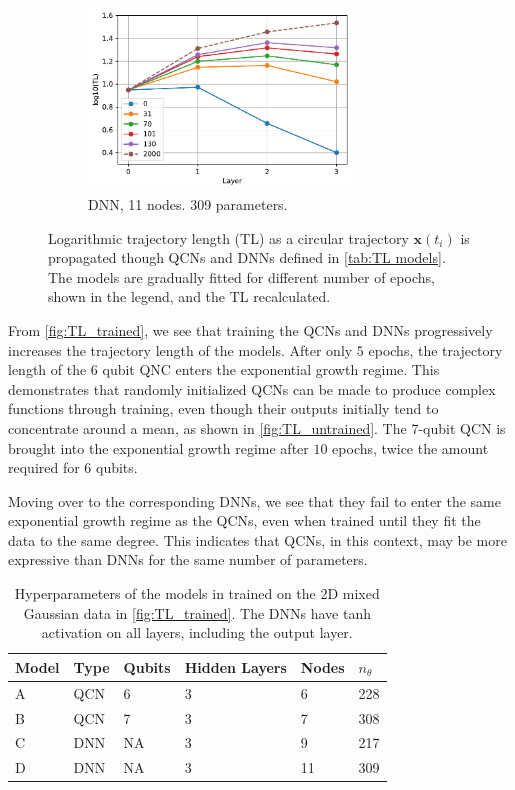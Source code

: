 \begin{figure}[H]
\begin{subfigure}[t]{0.5\textwidth}
    \end{subfigure}%
    \hfill 
    \begin{subfigure}[t]{0.5\textwidth}
        \centering
        \includegraphics[height=1.9in]{latex/figures/TL_trained_DNN_nodes_11}
        \caption{DNN, 11 nodes. 309 parameters.}
        \label{fig:TL_trained_D}
    \end{subfigure}
    \caption{Logarithmic trajectory length (TL) as a circular trajectory $\boldsymbol{x}(t_i)$ is propagated though QCNs and DNNs defined in \autoref{tab:TL models}. The models are gradually fitted for different number of epochs, shown in the legend, and the TL recalculated.}
    \label{fig:TL_trained}
\end{figure}

From \autoref{fig:TL_trained}, we see that training the QCNs and DNNs progressively increases the trajectory length of the models. After only $5$ epochs, the trajectory length of the 6 qubit QNC enters the exponential growth regime. This demonstrates that randomly initialized QCNs can be made to produce complex functions through training, even though their outputs initially tend to concentrate around a mean, as shown in \autoref{fig:TL_untrained}. The 7-qubit QCN is brought into the exponential growth regime after $10$ epochs, twice the amount required for 6 qubits. 

Moving over to the corresponding DNNs, we see that they fail to enter the same exponential growth regime as the QCNs, even when trained until they fit the data to the same degree. This indicates that QCNs, in this context, may be more expressive than DNNs for the same number of parameters.  

\begin{table}[H]
\centering
\begin{tabular}{|l|l|l|l|l|l|}
\hline
Model &Type & Qubits& Hidden Layers & Nodes &$n_{\theta}$ \\ \hline
A    & QCN & 6 &  3 & 6& 228   \\ \hline
B    & QCN & 7 &  3 & 7& 308 \\ \hline
C    & DNN & NA&  3 & 9& 217  \\ \hline
D    & DNN & NA&  3 & 11& 309  \\ \hline
\end{tabular}
\caption{Hyperparameters of the models in trained on the 2D mixed Gaussian data in \autoref{fig:TL_trained}. The DNNs have tanh activation on all layers, including the output layer.} 
\label{tab:TL models}
\end{table}


